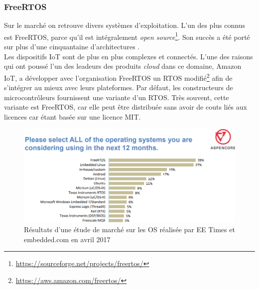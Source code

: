 \subsubsection{FreeRTOS}
\label{sec-RTOS_freertos}

Sur le marché on retrouve divers systèmes d'exploitation. L'un des plus connus est FreeRTOS, parce qu'il est intégralement \textit{open source}\footnote{\url{https://sourceforge.net/projects/freertos/}}. Son succès a été porté sur plus d'une cinquantaine d'architectures \cite{FreeRTOS23:online}. \\

Les dispositifs IoT sont de plus en plus complexes et connectés. L'une des raisons qui ont poussé l'un des leadeurs des produits \textit{cloud} dans ce domaine, Amazon IoT, a développer avec l'organisation FreeRTOS un RTOS modifié\footnote{\url{https://aws.amazon.com/freertos/}} afin de s'intégrer au mieux avec leurs plateformes. Par défaut, les constructeurs de microcontrôleurs fournissent une variante d'un RTOS. Très souvent, cette variante est FreeRTOS, car elle peut être distribuée sans avoir de couts liés aux licences car étant basée sur une licence MIT. \\

\begin{figure}[ht!]
    \centering
    \includegraphics[width=1.0\textwidth]{Figures/StateOfTheArt/embedded_markets_study_2017.PNG}
    \caption{Résultats d'une étude de marché sur les OS réalisée par EE Times et embedded.com en avril 2017}
    \label{fig:eetimes_2017_market_study}
\end{figure}

